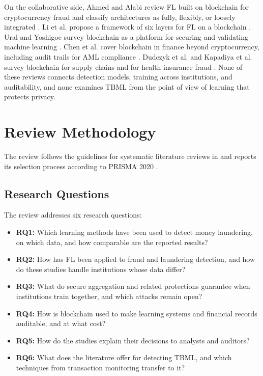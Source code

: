 \documentclass[journal]{IEEEtran}
\begin{document}
On the collaborative side, Ahmed and Alabi review FL built on blockchain for cryptocurrency fraud and classify architectures as fully, flexibly, or loosely integrated \cite{ahmed2024bcfl}. Li et al. propose a framework of six layers for FL on a blockchain \cite{li2021befl}. Ural and Yoshigoe survey blockchain as a platform for securing and validating machine learning \cite{ural2023bcml}. Chen et al. cover blockchain in finance beyond cryptocurrency, including audit trails for AML compliance \cite{chen2024finance}. Dudczyk et al. and Kapadiya et al. survey blockchain for supply chains and for health insurance fraud \cite{dudczyk2024supply,kapadiya2022health}. None of these reviews connects detection models, training across institutions, and auditability, and none examines TBML from the point of view of learning that protects privacy.

\section{Review Methodology}
\label{sec:method}

The review follows the guidelines for systematic literature reviews in \cite{kitchenham2007} and reports its selection process according to PRISMA 2020 \cite{page2021prisma}.

\subsection{Research Questions}

The review addresses six research questions:
\begin{itemize}
\item \textbf{RQ1:} Which learning methods have been used to detect money laundering, on which data, and how comparable are the reported results?
\item \textbf{RQ2:} How has FL been applied to fraud and laundering detection, and how do these studies handle institutions whose data differ?
\item \textbf{RQ3:} What do secure aggregation and related protections guarantee when institutions train together, and which attacks remain open?
\item \textbf{RQ4:} How is blockchain used to make learning systems and financial records auditable, and at what cost?
\item \textbf{RQ5:} How do the studies explain their decisions to analysts and auditors?
\item \textbf{RQ6:} What does the literature offer for detecting TBML, and which techniques from transaction monitoring transfer to it?
\end{itemize}
\end{document}
